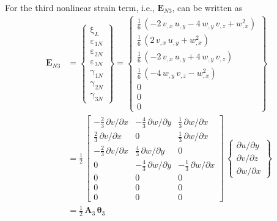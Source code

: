 For the third nonlinear strain term, i.e., $\mathbf{E}_{N3}$, can be written as
\begin{equation}
\begin{aligned}
\mathbf{E}_{N3} & =  \begin{Bmatrix}
\mathrm \xi_{L} \\
\mathrm \varepsilon_{1N} \\                    
\mathrm \varepsilon_{2N} \\           
\mathrm \varepsilon_{3N} \\           
\mathrm \gamma_{1N} \\                
\mathrm \gamma_{2N} \\                
\mathrm \gamma_{3N} \end{Bmatrix} =   
\begin{Bmatrix}                       
\tfrac{1}{6} \,  \left( - 2 \, v_{,x} \, u_{,y} - 4 \, w_{,y} \, v_{,z} +  w_{,x}^2  \right)\\
\tfrac{1}{6} \,  \left( 2 \, v_{,x} \, u_{,y}  +  w_{,x}^2  \right) \\
\tfrac{1}{6} \,  \left( - 2 \, v_{,x} \, u_{,y} + 4 \, w_{,y} \, v_{,z} \right) \\
\tfrac{1}{6} \,  \left( - 4 \, w_{,y} \, v_{,z} - w_{,x}^2 \right) \\ 
0 \\
0 \\ 
0 \end{Bmatrix} \\
& = \frac{1}{2} \, \begin{bmatrix}
- \tfrac{2}{3} \, \partial v / \partial x &  - \tfrac{4}{3} \, \partial w / \partial y &  \tfrac{1}{3} \, \partial w / \partial x   \\
\tfrac{2}{3} \, \partial v / \partial x &  0 & \tfrac{1}{3} \, \partial w / \partial x  \\
- \tfrac{2}{3} \, \partial v / \partial x & \tfrac{4}{3} \, \partial w / \partial y & 0 \\
0 &  - \tfrac{4}{3} \, \partial w / \partial y & - \tfrac{1}{3} \, \partial w / \partial x \\
0 &  0 & 0  \\
0 &  0 & 0  \\
0 &  0 & 0  \end{bmatrix} \, \begin{Bmatrix}
\partial u / \partial y\\
\partial v / \partial z \\
\partial w / \partial x
\end{Bmatrix} \\
& = \tfrac{1}{2} \, \mathbf{A}_3 \, \boldsymbol{\theta}_3
\end{aligned}
\end{equation}
